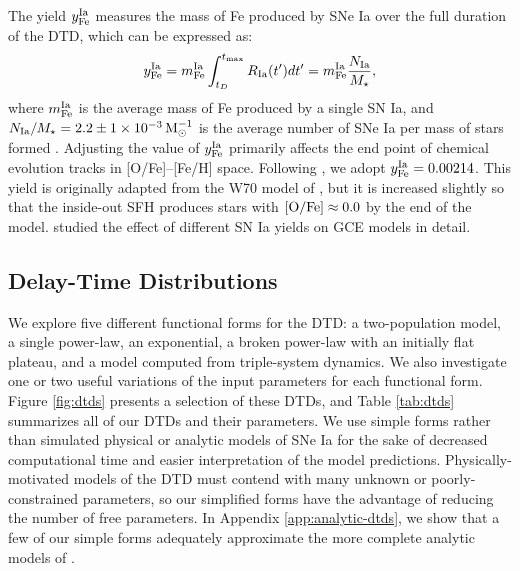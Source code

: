 \documentclass[twocolumn,twocolappendix,linenumbers]{aastex631}
\begin{document}
The yield $y_{\rm Fe}^{\rm Ia}$ measures the mass of Fe produced by SNe Ia over the full duration of the DTD, which can be expressed as:
\begin{equation}
    y_{\rm Fe}^{\rm Ia} = m_{\rm Fe}^{\rm Ia} \int_{t_D}^{t_{\rm max}} R_{\rm Ia}(t')dt' = m_{\rm Fe}^{\rm Ia} \frac{N_{\rm Ia}}{M_\star},
    \label{eq:dtd-integral}
\end{equation}
where $m_{\rm Fe}^{\rm Ia}$ is the average mass of Fe produced by a single SN Ia, and $N_{\rm Ia}/M_\star=2.2\pm1\times10^{-3}\,{\rm M}_\odot^{-1}$ is the average number of SNe Ia per mass of stars formed \citep{MaozMannucci2012-SNeIaReview}. Adjusting the value of $y_{\rm Fe}^{\rm Ia}$ primarily affects the end point of chemical evolution tracks in [O/Fe]--[Fe/H] space. Following , we adopt $y_{\rm Fe}^{\rm Ia}=0.00214$. This yield is originally adapted from the W70 model of \citet{Iwamoto1999-SNIaYields}, but it is increased slightly so that the inside-out SFH produces stars with ${\rm [O/Fe]}\approx 0.0$ by the end of the model. \citet{Palla2021-SNIaYield} studied the effect of different SN Ia yields on GCE models in detail.

\subsection{Delay-Time Distributions}
\label{sec:dtd-models}

We explore five different functional forms for the DTD: a two-population model, a single power-law, an exponential, a broken power-law with an initially flat plateau, and a model computed from triple-system dynamics. We also investigate one or two useful variations of the input parameters for each functional form. Figure \ref{fig:dtds} presents a selection of these DTDs, and Table \ref{tab:dtds} summarizes all of our DTDs and their parameters. We use simple forms rather than simulated physical or analytic models of SNe Ia for the sake of decreased computational time and easier interpretation of the model predictions. Physically-motivated models of the DTD must contend with many unknown or poorly-constrained parameters, so our simplified forms have the advantage of reducing the number of free parameters. In Appendix \ref{app:analytic-dtds}, we show that a few of our simple forms adequately approximate the more complete analytic models of \citet{Greggio2005-AnalyticalRates}. 
\end{document}

